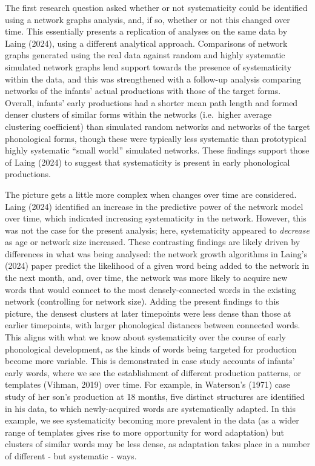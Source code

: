 \documentclass[
  man]{apa6}
\begin{document}
The first research question asked whether or not systematicity could be identified using a network graphs analysis, and, if so, whether or not this changed over time. This essentially presents a replication of analyses on the same data by Laing (2024), using a different analytical approach. Comparisons of network graphs generated using the real data against random and highly systematic simulated network graphs lend support towards the presence of systematicity within the data, and this was strengthened with a follow-up analysis comparing networks of the infants' actual productions with those of the target forms. Overall, infants' early productions had a shorter mean path length and formed denser clusters of similar forms within the networks (i.e.~higher average clustering coefficient) than simulated random networks and networks of the target phonological forms, though these were typically less systematic than prototypical highly systematic ``small world'' simulated networks. These findings support those of Laing (2024) to suggest that systematicity is present in early phonological productions.

The picture gets a little more complex when changes over time are considered. Laing (2024) identified an increase in the predictive power of the network model over time, which indicated increasing systematicity in the network. However, this was not the case for the present analysis; here, systematicity appeared to \emph{decrease} as age or network size increased. These contrasting findings are likely driven by differences in what was being analysed: the network growth algorithms in Laing's (2024) paper predict the likelihood of a given word being added to the network in the next month, and, over time, the network was more likely to acquire new words that would connect to the most densely-connected words in the existing network (controlling for network size). Adding the present findings to this picture, the densest clusters at later timepoints were less dense than those at earlier timepoints, with larger phonological distances between connected words. This aligns with what we know about systematicity over the course of early phonological development, as the kinds of words being targeted for production become more variable. This is demonstrated in case study accounts of infants' early words, where we see the establishment of different production patterns, or templates (Vihman, 2019) over time. For example, in Waterson's (1971) case study of her son's production at 18 months, five distinct structures are identified in his data, to which newly-acquired words are systematically adapted. In this example, we see systematicity becoming more prevalent in the data (as a wider range of templates gives rise to more opportunity for word adaptation) but clusters of similar words may be less dense, as adaptation takes place in a number of different - but systematic - ways.
\end{document}
